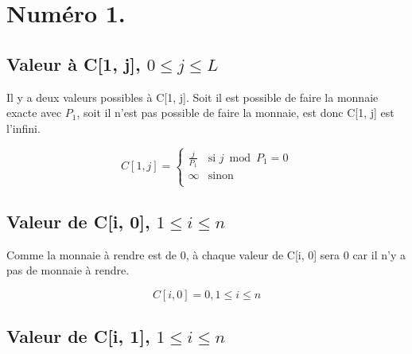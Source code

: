 \documentclass[10.9pt]{article} %
\begin{document}

\tableofcontents %

\newpage %



\section{Numéro 1.}

\subsection{Valeur à C[1, j], $0\le j \le L$}


Il y a deux valeurs possibles à C[1, j]. Soit il est possible de faire la monnaie exacte 
avec $P_1$, soit il n'est pas possible de faire la monnaie, est donc C[1, j] est l'infini.

\begin{equation}
C[1,j] = 
\begin{cases}
 \frac{j}{P_1}  &\text{si } j \bmod P_1 = 0\\
 \infty                   &\text{sinon}\\
\end{cases}
\end{equation}

\subsection{Valeur de C[i, 0], $1 \le i \le n$}

Comme la monnaie à rendre est de 0, à chaque valeur de C[i, 0] sera 0 car il n'y a pas
de monnaie à rendre.

\begin{equation}
 C[i, 0] = 0, 1 \le i \le n
\end{equation}

\subsection{Valeur de C[i, 1], $1 \le i \le n$}
\end{document}
